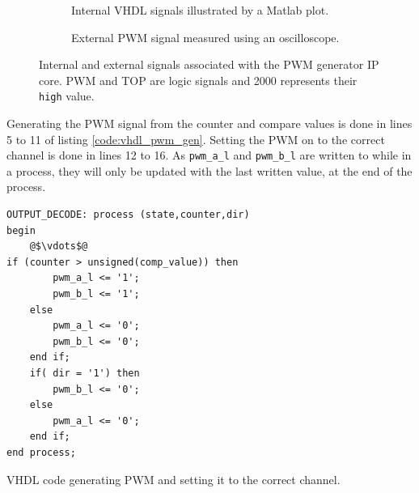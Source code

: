 \begin{figure}
    \centering
    \begin{subfigure}[b]{0.45\textwidth}
        \caption{Internal VHDL signals illustrated by a Matlab plot.}
        \label{sfig:pwm_gen_int}
    \end{subfigure}
    \begin{subfigure}[b]{0.45\textwidth}
        \caption{External PWM signal measured using an oscilloscope. }
        \label{sfig:pwm_gen_ext}
    \end{subfigure}
    \caption[Signals associated with the PWM generator IP core]{Internal and external signals associated with the PWM generator IP core. PWM and TOP are logic signals and 2000 represents their \texttt{high} value.}
    \label{fig:vhdl_pwm_gen}
\end{figure}

Generating the PWM signal from the counter and compare values is done in lines 5 to 11 of listing \ref{code:vhdl_pwm_gen}.
Setting the PWM on to the correct channel is done in lines 12 to 16.
As \texttt{pwm\_a\_l} and \texttt{pwm\_b\_l} are written to while in a process, they will only be updated with the last written value, at the end of the process.

\begin{listing}[H]
\begin{verbatim}
OUTPUT_DECODE: process (state,counter,dir)
begin
	@$\vdots$@
if (counter > unsigned(comp_value)) then
		pwm_a_l <= '1';
		pwm_b_l <= '1';
	else
		pwm_a_l <= '0';
		pwm_b_l <= '0';
	end if;	
	if( dir = '1') then 
		pwm_b_l <= '0';
	else 
		pwm_a_l <= '0';	
	end if;
end process;		
\end{verbatim}
\caption[VHDL code generating PWM signals.]{VHDL code generating PWM and setting it to the correct channel.}
\label{code:vhdl_pwm_gen}
\end{listing}

